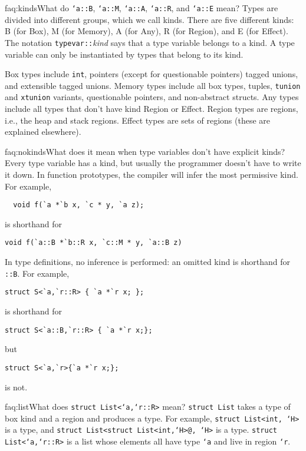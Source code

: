 \begin{faqa}{faq:kinds}{What do \texttt{`a::B}, \texttt{`a::M}, \texttt{`a::A}, \texttt{`a::R}, and \texttt{`a::E} mean?}
Types are divided into different groups, which we call kinds.  There
are five different kinds: B (for Box), M (for Memory), A (for Any), R
(for Region), and E (for Effect).  The notation
\texttt{typevar}\texttt{::}\textit{kind} says that a type variable
belongs to a kind.  A type variable can only be instantiated by types
that belong to its kind.

Box types include \texttt{int}, pointers (except for questionable
pointers) tagged unions, and extensible tagged unions.
Memory types include all box types, tuples, \texttt{tunion} and
\texttt{xtunion} variants, questionable pointers, and non-abstract structs.
Any types include all types that don't have kind Region or Effect.
Region types are regions, i.e., the heap and stack regions.
Effect types are sets of regions (these are explained elsewhere).
\end{faqa}

\begin{faqa}{faq:nokinds}{What does it mean when type variables don't have explicit kinds?}
Every type variable has a kind, but usually the programmer doesn't
have to write it down.  In function prototypes, the compiler will
infer the most permissive kind.  For example,
\begin{verbatim}
  void f(`a *`b x, `c * y, `a z);
\end{verbatim}
is shorthand for
\begin{verbatim}
void f(`a::B *`b::R x, `c::M * y, `a::B z)
\end{verbatim}
In type definitions, no inference is performed: an omitted kind is
shorthand for \texttt{::B}.  For example,
\begin{verbatim}
struct S<`a,`r::R> { `a *`r x; };
\end{verbatim}
is shorthand for
\begin{verbatim}
struct S<`a::B,`r::R> { `a *`r x;};
\end{verbatim}
but
\begin{verbatim}
struct S<`a,`r>{`a *`r x;};
\end{verbatim}
is not.
\end{faqa}

\begin{faqa}{faq:list}{What does \texttt{struct List<`a,`r::R>} mean?}
\texttt{struct List} takes a type of box kind and a region and
produces a type.  For example, \texttt{struct List<int, `H>} is a
type, and \texttt{struct List<struct List<int,`H>@, `H>} is a type.
\texttt{struct List<`a,`r::R>} is a list whose elements all have type
\texttt{`a} and live in region \texttt{`r}.
\end{faqa}

